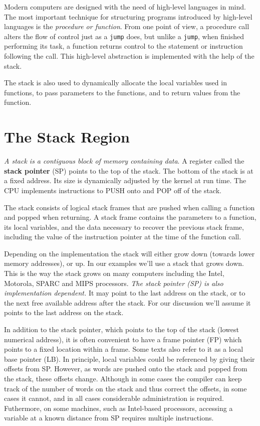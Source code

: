 \documentclass[a4paper]{article}
\begin{document}
Modern computers are designed with the need of high-level languages in mind. The most important technique for structuring programs introduced by high-level languages is the \textit{procedure or function}. From one point of view, a procedure call alters the flow of control just as a \texttt{jump} does, but unlike a \texttt{jump}, when finished performing its task, a function returns control to the statement or instruction following the call. This high-level abstraction is implemented with the help of the stack.

The stack is also used to dynamically allocate the local variables used in functions, to pass parameters to the functions, and to return values from the function.

\section{The Stack Region}
\textit{A stack is a contiguous block of memory containing data}. A register called the \textbf{stack pointer} (SP) points to the top of the stack. The bottom of the stack is at a fixed address. Its size is dynamically adjusted by the kernel at run time. The CPU implements instructions to PUSH onto and POP off of the stack.

The stack consists of logical stack frames that are pushed when calling a function and popped when returning. A stack frame contains the parameters to a function, its local variables, and the data necessary to recover the previous stack frame, including the value of the instruction pointer at the time of the function call.

Depending on the implementation the stack will either grow down (towards lower memory addresses), or up. In our examples we’ll use a stack that grows down. This is the way the stack grows on many computers including the Intel, Motorola, SPARC and MIPS processors. \textit{The stack pointer (SP) is also implementation dependent.} It may point to the last address on the stack, or to the next free available address after the stack. For our discussion we’ll assume it points to the last address on the stack.

In addition to the stack pointer, which points to the top of the stack (lowest numerical address), it is often convenient to have a frame pointer (FP) which points to a fixed location within a frame. Some texts also refer to it as a local base pointer (LB). In principle, local variables could be referenced by giving their offsets from SP. However, as words are pushed onto the stack and popped from the stack, these offsets change. Although in some cases the compiler can keep track of the number of words on the stack and thus correct the offsets, in some cases it cannot, and in all cases considerable administration is required. Futhermore, on some machines, such as Intel-based processors, accessing a variable at a known distance from SP requires multiple instructions.
\end{document}
